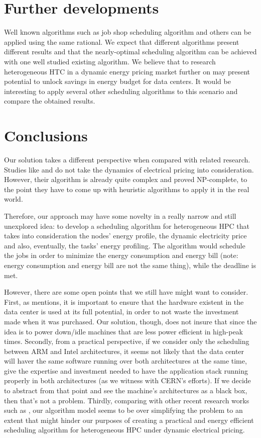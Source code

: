 \section{Further developments}

Well known algorithms such as job shop scheduling algorithm and others can be applied using the same rational. We expect that different algorithms present different results and that the nearly-optimal scheduling algorithm can be achieved with one well studied existing algorithm. We believe that to research heterogeneous HTC in a dynamic energy pricing market further on may present potential to unlock savings in energy budget for data centers. It would be interesting to apply several other scheduling algorithms to this scenario and compare the obtained results.

\section{Conclusions}

Our solution takes a different perspective when compared with related research. Studies like  \cite{TASK_SCHED} and \cite{EXE_METHOD} do not take the
dynamics of electrical pricing into consideration. However, their algorithm is
already quite complex and proved NP-complete, to the point they have to come up
with heuristic algorithms to apply it in the real world.

Therefore, our approach may have some novelty in a really narrow and still
unexplored idea: to develop a scheduling algorithm for heterogeneous HPC that
takes into consideration the nodes' energy profile, the dynamic electricity
price and also, eventually, the tasks' energy profiling. The algorithm would
schedule the jobs in order to minimize the energy consumption and energy bill
(note: energy consumption and energy bill are not the same thing), while the
deadline is met. 

However, there are some open points that we still have might want to
consider. First, as \cite{DYN_PRICING_HPC} mentions, it is important to ensure
that the hardware existent in the data center is used at its full potential, in
order to not waste the investment made when it was purchased. Our solution,
though, does not insure that since the idea is to power down/idle machines that 
are less power efficient in high-peak times. Secondly, from a practical
perspective, if we consider only the scheduling between ARM and Intel architectures, 
it seems not likely that the data center will haver the same software running
over both architectures at the same time, give the expertise and investment
needed to have the application stack running properly in both architectures (as
we witness with CERN's efforts). If we decide to abstract from that point and
see the machine's architectures as a black box, then that's not a problem. Thirdly, 
comparing with other recent research works
such as \cite{TASK_SCHED}, our algorithm model seems to be over simplifying the
problem to an extent that might hinder our purposes of creating a practical and
energy efficient scheduling algorithm for heterogeneous HPC under dynamic
electrical pricing.

